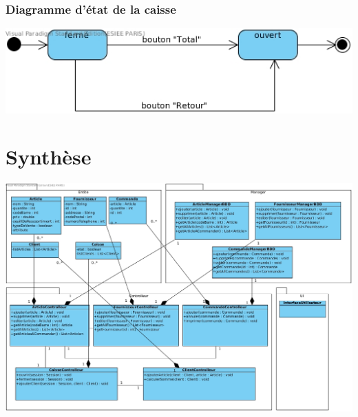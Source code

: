 \subsection{Diagramme d'état de la caisse}
\begin{center}
	\includegraphics[width=14cm]{DiagrammeEtatCaisse.jpg}
\end{center}


\chapter{Synthèse}
\begin{center}
	\includegraphics[width=15cm]{DiagrammeDeClasse.jpg}
\end{center}


	
